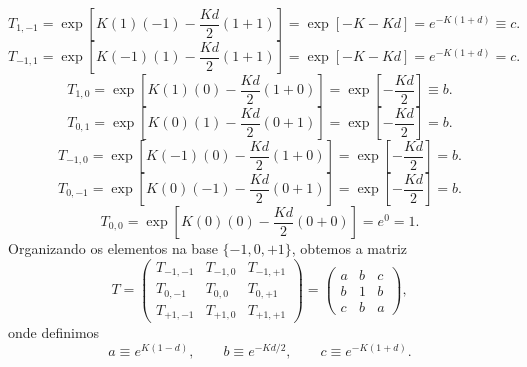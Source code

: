 \documentclass[11pt,a4paper]{article}
\begin{document}
%
\begin{equation}
    T_{1,-1} = \exp\left[ K (1)(-1) - \frac{Kd}{2} (1 + 1) \right]
    = \exp\left[ -K - Kd \right]
    = e^{-K(1+d)} \equiv c.
\end{equation}
%
\begin{equation}
    T_{-1,1} = \exp\left[ K (-1)(1) - \frac{Kd}{2} (1 + 1) \right]
    = \exp\left[ -K - Kd \right]
    = e^{-K(1+d)} = c.
\end{equation}
%
\begin{equation}
    T_{1,0} = \exp\left[ K (1)(0) - \frac{Kd}{2} (1 + 0) \right]
    = \exp\left[ -\frac{Kd}{2} \right]
    \equiv b.
\end{equation}
%
\begin{equation}
    T_{0,1} = \exp\left[ K (0)(1) - \frac{Kd}{2} (0 + 1) \right]
    = \exp\left[ -\frac{Kd}{2} \right]
    = b.
\end{equation}
%
\begin{equation}
    T_{-1,0} = \exp\left[ K (-1)(0) - \frac{Kd}{2} (1 + 0) \right]
    = \exp\left[ -\frac{Kd}{2} \right]
    = b.
\end{equation}
%
\begin{equation}
    T_{0,-1} = \exp\left[ K (0)(-1) - \frac{Kd}{2} (0 + 1) \right]
    = \exp\left[ -\frac{Kd}{2} \right]
    = b.
\end{equation}
%
\begin{equation}
    T_{0,0} = \exp\left[ K (0)(0) - \frac{Kd}{2} (0 + 0) \right]
    = e^0 = 1.
\end{equation}
%
Organizando os elementos na base \(\{-1,0,+1\}\), obtemos a matriz
%
\begin{equation}
    T =
    \begin{pmatrix}
        T_{-1,-1} & T_{-1,0} & T_{-1,+1} \\
        T_{0,-1}  & T_{0,0}  & T_{0,+1}  \\
        T_{+1,-1} & T_{+1,0} & T_{+1,+1}
    \end{pmatrix}
    =
    \begin{pmatrix}
        a & b & c \\
        b & 1 & b \\
        c & b & a
    \end{pmatrix},
    \label{eq:T_final}
\end{equation}
%
onde definimos
%
\begin{equation}
    a \equiv e^{K(1-d)},
    \qquad
    b \equiv e^{-Kd/2},
    \qquad
    c \equiv e^{-K(1+d)}.
    \label{eq:def_abc}
\end{equation}
\end{document}
